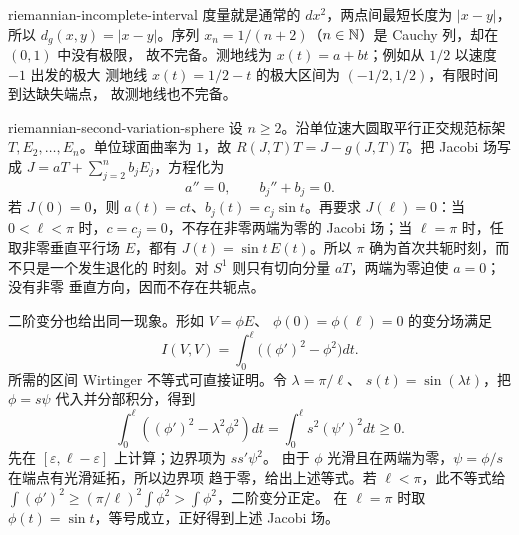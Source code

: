 \begin{solution}{riemannian-incomplete-interval}
度量就是通常的 $dx^2$，两点间最短长度为 $|x-y|$，所以
$d_g(x,y)=|x-y|$。序列 $x_n=1/(n+2)$（$n\in\mathbb{N}$）是 Cauchy 列，却在 $(0,1)$ 中没有极限，
故不完备。测地线为 $x(t)=a+bt$；例如从 $1/2$ 以速度 $-1$ 出发的极大
测地线 $x(t)=1/2-t$ 的极大区间为 $(-1/2,1/2)$，有限时间到达缺失端点，
故测地线也不完备。
\end{solution}

\begin{solution}{riemannian-second-variation-sphere}
设 $n\geq2$。沿单位速大圆取平行正交规范标架
$T,E_2,\ldots,E_n$。单位球面曲率为 $1$，故
$R(J,T)T=J-g(J,T)T$。把 Jacobi 场写成
$J=aT+\sum_{j=2}^nb_jE_j$，方程化为
\[
 a''=0,\qquad b_j''+b_j=0.
\]
若 $J(0)=0$，则 $a(t)=ct$、$b_j(t)=c_j\sin t$。再要求
$J(\ell)=0$：当 $0<\ell<\pi$ 时，$c=c_j=0$，不存在非零两端为零的 Jacobi
场；当 $\ell=\pi$ 时，任取非零垂直平行场 $E$，都有
$J(t)=\sin t\,E(t)$。所以 $\pi$ 确为首次共轭时刻，而不只是一个发生退化的
时刻。对 $S^1$ 则只有切向分量 $aT$，两端为零迫使 $a=0$；没有非零
垂直方向，因而不存在共轭点。

二阶变分也给出同一现象。形如 $V=\phi E$、
$\phi(0)=\phi(\ell)=0$ 的变分场满足
\[
 I(V,V)=\int_0^\ell\bigl((\phi')^2-\phi^2\bigr)dt.
\]
所需的区间 Wirtinger 不等式可直接证明。令 $\lambda=\pi/\ell$、
$s(t)=\sin(\lambda t)$，把 $\phi=s\psi$ 代入并分部积分，得到
\[
 \int_0^\ell\left((\phi')^2-\lambda^2\phi^2\right)dt
 =\int_0^\ell s^2(\psi')^2dt\geq0.
\]
先在 $[\varepsilon,\ell-\varepsilon]$ 上计算；边界项为 $ss'\psi^2$。
由于 $\phi$ 光滑且在两端为零，$\psi=\phi/s$ 在端点有光滑延拓，所以边界项
趋于零，给出上述等式。若 $\ell<\pi$，此不等式给
$\int(\phi')^2\ge(\pi/\ell)^2\int\phi^2>\int\phi^2$，二阶变分正定。
在 $\ell=\pi$ 时取 $\phi(t)=\sin t$，等号成立，正好得到上述 Jacobi 场。
\end{solution}
